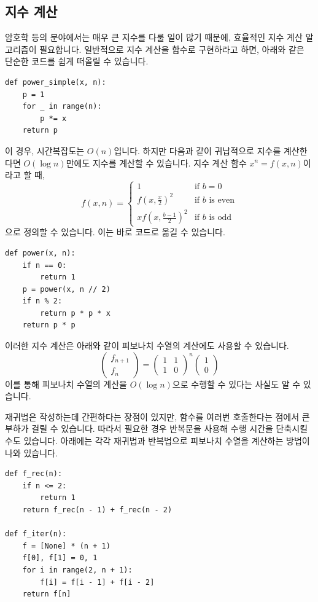 \documentclass[../main.tex]{subfiles}
\begin{document}
\subsection{지수 계산}
암호학 등의 분야에서는 매우 큰 지수를 다룰 일이 많기 때문에, 효율적인 지수 계산 알고리즘이 필요합니다.
일반적으로 지수 계산을 함수로 구현하라고 하면, 아래와 같은 단순한 코드를 쉽게 떠올릴 수 있습니다.
\begin{verbatim}
def power_simple(x, n):
    p = 1
    for _ in range(n):
        p *= x
    return p
\end{verbatim}
이 경우, 시간복잡도는 $O(n)$입니다.
하지만 다음과 같이 귀납적으로 지수를 계산한다면 $O(\log n)$만에도 지수를 계산할 수 있습니다.
지수 계산 함수 $x^n = f(x, n)$이라고 할 때,
\[
f(x, n) = \begin{cases}
1 & \text{if } b = 0\\
f\left(x, \frac x2 \right)^2 & \text{if } b \text{ is even}\\
x f\left(x, \frac{b - 1}{2}\right)^2 & \text{if } b \text{ is odd}
\end{cases}
\]
으로 정의할 수 있습니다.
이는 바로 코드로 옮길 수 있습니다.
\begin{verbatim}
def power(x, n):
    if n == 0:
        return 1
    p = power(x, n // 2)
    if n % 2:
        return p * p * x
    return p * p
\end{verbatim}
이러한 지수 계산은 아래와 같이 피보나치 수열의 계산에도 사용할 수 있습니다.
\[
\begin{pmatrix}f_{n + 1} \\ f_n \end{pmatrix} = \begin{pmatrix}1 & 1 \\ 1 & 0 \end{pmatrix}^n \begin{pmatrix} 1 \\ 0 \end{pmatrix}
\]
이를 통해 피보나치 수열의 계산을 $O(\log n)$으로 수행할 수 있다는 사실도 알 수 있습니다.

재귀법은 작성하는데 간편하다는 장점이 있지만, 함수를 여러번 호출한다는 점에서 큰 부하가 걸릴 수 있습니다.
따라서 필요한 경우 반복문을 사용해 수행 시간을 단축시킬 수도 있습니다.
아래에는 각각 재귀법과 반복법으로 피보나치 수열을 계산하는 방법이 나와 있습니다.

\begin{verbatim}
def f_rec(n):
    if n <= 2:
        return 1
    return f_rec(n - 1) + f_rec(n - 2)

def f_iter(n):
    f = [None] * (n + 1)
    f[0], f[1] = 0, 1
    for i in range(2, n + 1):
        f[i] = f[i - 1] + f[i - 2]
    return f[n]
\end{verbatim}
\end{document}
